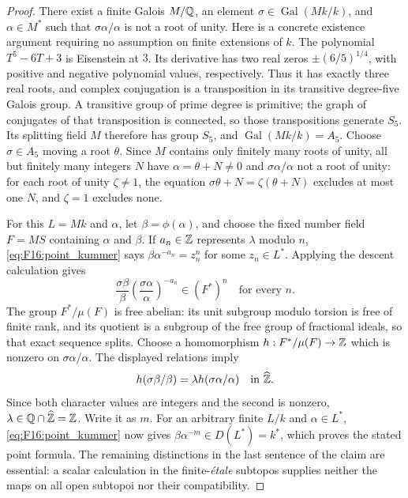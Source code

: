 \begin{proof}
There exist a finite Galois $M/\mathbb Q$, an element
$\sigma\in\operatorname{Gal}(Mk/k)$, and $\alpha\in M^*$ such
that $\sigma\alpha/\alpha$ is not a root of unity. Here is a
concrete existence argument requiring no assumption on finite
extensions of $k$. The polynomial $T^5-6T+3$ is Eisenstein at $3$.
Its derivative has two real zeros $\pm(6/5)^{1/4}$, with positive
and negative polynomial values, respectively. Thus it has exactly
three real roots, and complex conjugation is a transposition in its
transitive degree-five Galois group. A transitive group of prime
degree is primitive; the graph of conjugates of that transposition
is connected, so those transpositions generate $S_5$. Its splitting
field $M$ therefore has group $S_5$, and
$\operatorname{Gal}(Mk/k)=A_5$. Choose $\sigma\in A_5$ moving a
root $\theta$. Since $M$ contains only finitely many roots of unity,
all but finitely many integers $N$ have
$\alpha=\theta+N\ne0$ and $\sigma\alpha/\alpha$ not a root of
unity: for each root of unity $\zeta\ne1$, the equation
$\sigma\theta+N=\zeta(\theta+N)$ excludes at most one $N$,
and $\zeta=1$ excludes none.

For this $L=Mk$ and $\alpha$, let $\beta=\phi(\alpha)$, and
choose the fixed number field $F=MS$ containing $\alpha$ and
$\beta$. If $a_n\in\mathbb Z$ represents $\lambda$ modulo $n$,
\eqref{eq:F16:point_kummer} says
$\beta\alpha^{-a_n}=z_n^n$ for some $z_n\in L^*$. Applying the
descent calculation gives
\[
 \frac{\sigma\beta}{\beta}
 \left(\frac{\sigma\alpha}{\alpha}\right)^{-a_n}
       \in(F^*)^n \quad\text{for every }n.
\]
The group $F^*/\mu(F)$ is free abelian: its unit subgroup modulo
torsion is free of finite rank, and its quotient is a subgroup of
the free group of fractional ideals, so that exact sequence splits.
Choose a homomorphism $h:F^*/\mu(F)\to\mathbb Z$ which is nonzero on
$\sigma\alpha/\alpha$. The displayed relations imply
\[
 h(\sigma\beta/\beta)
  =\lambda h(\sigma\alpha/\alpha)\quad\text{in }\widehat{\mathbb Z}.
\]
Since both character values are integers and the second is nonzero,
$\lambda\in\mathbb Q\cap\widehat{\mathbb Z}=\mathbb Z$. Write it as $m$.
For an arbitrary finite $L/k$ and $\alpha\in L^*$,
\eqref{eq:F16:point_kummer} now gives
$\beta\alpha^{-m}\in D(L^*)=k^*$, which proves the stated
point formula. The remaining distinctions in the last sentence of
the claim are essential: a scalar calculation in the finite-\emph{\'etale}
subtopos supplies neither the maps on all open subtopoi nor their
compatibility.
\end{proof}

